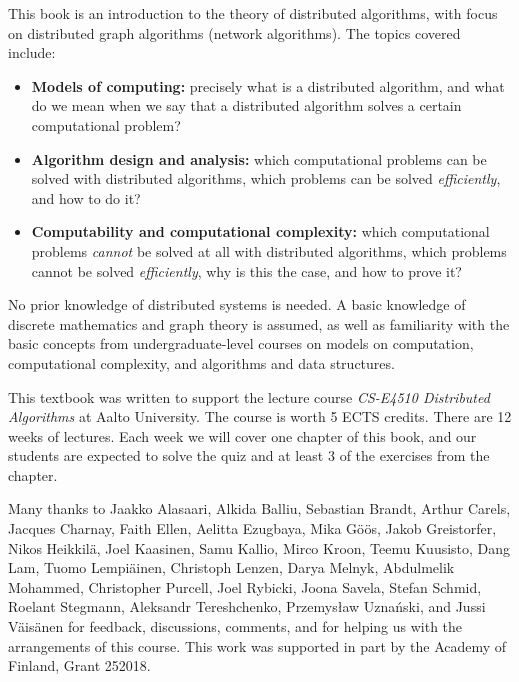 
This book is an introduction to the theory of distributed algorithms, with focus on distributed graph algorithms (network algorithms). The topics covered include:
\begin{itemize}
    \item \textbf{Models of computing:} precisely what is a distributed algorithm, and what do we mean when we say that a distributed algorithm solves a certain computational problem?
    \item \textbf{Algorithm design and analysis:} which computational problems can be solved with distributed algorithms, which problems can be solved \emph{efficiently}, and how to do it?
    \item \textbf{Computability and computational complexity:} which computational problems \emph{cannot} be solved at all with distributed algorithms, which problems cannot be solved \emph{efficiently}, why is this the case, and how to prove it?
\end{itemize}
No prior knowledge of distributed systems is needed. A basic knowledge of discrete mathematics and graph theory is assumed, as well as familiarity with the basic concepts from undergraduate-level courses on models on computation, computational complexity, and algorithms and data structures.



This textbook was written to support the lecture course \emph{CS-E4510 Distributed Algorithms} at Aalto University. The course is worth 5 ECTS credits. There are 12 weeks of lectures. Each week we will cover one chapter of this book, and our students are expected to solve the quiz and at least 3 of the exercises from the chapter.



Many thanks to
Jaak\-ko Ala\-saari,
Alki\-da Balliu,
Sebastian Brandt,
Arthur Carels,
Jacques Charnay,
Faith Ellen,
Aelitta Ezugbaya,
Mika G\"o\"os,
Ja\-kob Greistorfer,
Nikos Heik\-kil\"a,
Joel Kaa\-si\-nen,
Samu Kal\-lio,
Mir\-co Kroon,
Tee\-mu Kuu\-sisto,
Dang Lam,
Tuo\-mo Lem\-pi\"a\-inen,
Christoph Len\-zen,
Darya Melnyk,
Abdul\-melik Mohammed,
Christopher Purcell,
Joel Ry\-bicki,
Joo\-na Sa\-ve\-la,
Stefan Schmid,
Roelant Steg\-mann,
Aleksandr Tereshchenko,
Przemys\l{}aw Uzna\'nski,
and
Jussi V\"ai\-s\"a\-nen
for feedback, discussions, comments, and for helping us with the arrangements of this course. This work was supported in part by the Academy of Finland, Grant 252018.


